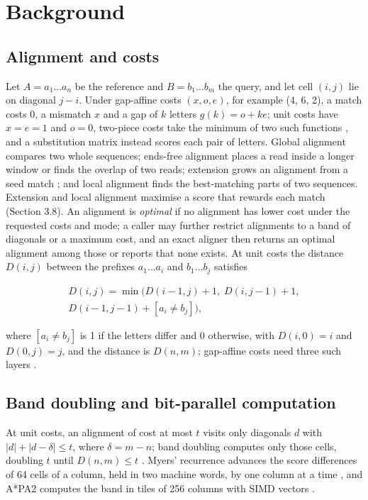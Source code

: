 \documentclass[nocrop,noinfo]{bioinfo}
\begin{document}
\section{Background}

\subsection{Alignment and costs}

Let \(A=a_1\dots a_n\) be the reference and \(B=b_1\dots b_m\) the query, and let cell \((i,j)\) lie on diagonal \(j-i\). Under gap-affine costs \((x, o, e)\), for example (4, 6, 2), a match costs 0, a mismatch \(x\) and a gap of \(k\) letters \(g(k)=o+ke\); unit costs have \(x=e=1\) and \(o=0\), two-piece costs take the minimum of two such functions \citep{Li2018minimap2}, and a substitution matrix instead scores each pair of letters. Global alignment compares two whole sequences; ends-free alignment places a read inside a longer window or finds the overlap of two reads; extension grows an alignment from a seed match \citep{Li2018minimap2}; and local alignment finds the best-matching parts of two sequences. Extension and local alignment maximise a score that rewards each match (Section 3.8). An alignment is \emph{optimal} if no alignment has lower cost under the requested costs and mode; a caller may further restrict alignments to a band of diagonals or a maximum cost, and an exact aligner then returns an optimal alignment among those or reports that none exists. At unit costs the distance \(D(i,j)\) between the prefixes \(a_1\dots a_i\) and \(b_1\dots b_j\) satisfies

\begin{equation}\begin{gathered}
D(i,j) = \min\bigl(D(i-1,j)+1,\; D(i,j-1)+1,\\ D(i-1,j-1)+[a_i \ne b_j]\bigr),
\end{gathered}\end{equation}

where \([a_i \ne b_j]\) is 1 if the letters differ and 0 otherwise, with \(D(i,0)=i\) and \(D(0,j)=j\), and the distance is \(D(n,m)\); gap-affine costs need three such layers \citep{Gotoh1982}.

\subsection{Band doubling and bit-parallel computation}

At unit costs, an alignment of cost at most \(t\) visits only diagonals \(d\) with \(|d| + |d - \delta| \le t\), where \(\delta = m - n\); band doubling computes only those cells, doubling \(t\) until \(D(n,m) \le t\) \citep{Ukkonen1985}. Myers' recurrence advances the score differences of 64 cells of a column, held in two machine words, by one column at a time \citep{Myers1999bitvector}, and A*PA2 computes the band in tiles of 256 columns with SIMD vectors \citep{GrootKoerkamp2024astarpa2}.
\end{document}
